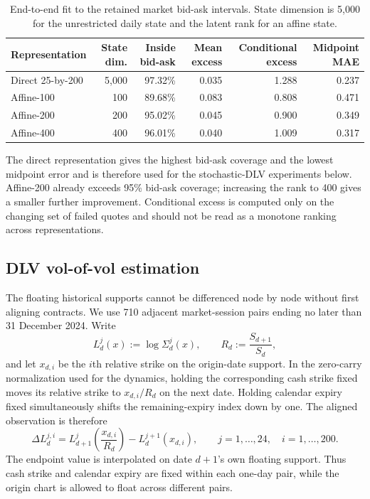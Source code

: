 \documentclass[11pt]{article}
\theoremstyle{plain}
\theoremstyle{definition}
\theoremstyle{remark}
\begin{document}
\begin{table}[H]
\centering
\small
\begin{tabular}{lrrrrr}
\toprule
Representation & State dim. & Inside bid-ask & Mean excess
  & Conditional excess & Midpoint MAE\\
\midrule
Direct 25-by-200 & 5,000 & 97.32\% & 0.035 & 1.288 & 0.237\\
Affine-100       &   100 & 89.68\% & 0.083 & 0.808 & 0.471\\
Affine-200       &   200 & 95.02\% & 0.045 & 0.900 & 0.349\\
Affine-400       &   400 & 96.01\% & 0.040 & 1.009 & 0.317\\
\bottomrule
\end{tabular}
\caption{End-to-end fit to the retained market bid-ask intervals. State
dimension is 5,000 for the unrestricted daily state and the latent rank for an
affine state.}
\label{tab:numerics-static-market-fit}
\end{table}

The direct representation gives the highest bid-ask coverage and the lowest
midpoint error and is therefore used for the stochastic-DLV experiments below.
Affine-200 already exceeds 95\% bid-ask coverage; increasing the rank to 400
gives a smaller further improvement. Conditional excess is computed only on
the changing set of failed quotes and should not be read as a monotone ranking
across representations.

\subsection{DLV vol-of-vol estimation}
\label{sec:estimation-vol-of-vol}

The floating historical supports cannot be differenced node by node without
first aligning contracts.  We use 710 adjacent market-session pairs ending no
later than 31 December 2024.  Write
\[
  L_d^j(x):=\log\Sigma_d^j(x),
  \qquad R_d:=\frac{S_{d+1}}{S_d},
\]
and let $x_{d,i}$ be the $i$th relative strike on the origin-date support.  In
the zero-carry normalization used for the dynamics, holding the corresponding
cash strike fixed moves its relative strike to $x_{d,i}/R_d$ on the next date.
Holding calendar expiry fixed simultaneously shifts the remaining-expiry index
down by one.  The aligned observation is therefore
\begin{equation}
  \label{eq:estimation-fixed-contract-increment}
  \Delta L_d^{j,i}
  =L_{d+1}^{j}\!\left(\frac{x_{d,i}}{R_d}\right)
   -L_d^{j+1}(x_{d,i}),
  \qquad j=1,\ldots,24,\quad i=1,\ldots,200.
\end{equation}
The endpoint value is interpolated on date $d+1$'s own floating support.  Thus
cash strike and calendar expiry are fixed within each one-day pair, while the
origin chart is allowed to float across different pairs.
\end{document}
